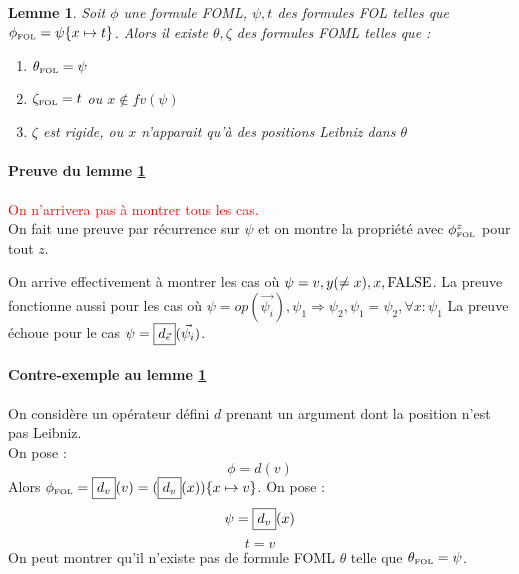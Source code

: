 \documentclass[12pt]{article}
\newcommand{\FOL}{\ensuremath{\textup{\tiny{}FOL}}}
\newcommand{\raph}[1]{\textcolor{red}{#1}}
\newtheorem{lem}{Lemme}
\begin{document}
\begin{lem}
  \label{lemme-theta}
  Soit $\phi$ une formule FOML, $\psi, t$ des formules FOL telles que $\phi_\FOL = \psi\{x \mapsto t\}$.
  Alors il existe $\theta, \zeta$ des formules FOML telles que :
  \begin{enumerate}
  \item
    $\theta_\FOL = \psi$
  \item
    $\zeta_\FOL = t$ ou $x \notin fv(\psi)$
  \item
    $\zeta$ est rigide, ou $x$ n'apparait qu'à des positions Leibniz dans $\theta$
  \end{enumerate}
\end{lem}

\paragraph{Preuve du lemme \ref{lemme-theta}}

\raph{On n'arrivera pas à montrer tous les cas.}\\
On fait une preuve par récurrence sur $\psi$ et on montre la propriété avec $\phi_\FOL^z$ pour tout $z$.

On arrive effectivement à montrer les cas où $\psi = v, y (\neq x), x, \textup{FALSE}$.
La preuve fonctionne aussi pour les cas où $\psi = op(\vec{\psi_i}), \psi_1 \Rightarrow \psi_2, \psi_1 = \psi_2, \forall x : \psi_1$
La preuve échoue pour le cas \(\psi = \framebox{$d_{\vec{\epsilon}}$}(\vec{\psi_i}) \).

\paragraph{Contre-exemple au lemme \ref{lemme-theta}}

On considère un opérateur défini $d$ prenant un argument dont la position n'est pas Leibniz. \\
On pose :
\[ \phi = d(v) \]
Alors \(\phi_\FOL = \framebox{$d_v$}(v) = (\framebox{$d_v$}(x))\{x \mapsto v\} \).
On pose :
\[ \psi = \framebox{$d_v$}(x) \]
\[ t = v \]
On peut montrer qu'il n'existe pas de formule FOML $\theta$ telle que $\theta_\FOL = \psi$.
\end{document}
